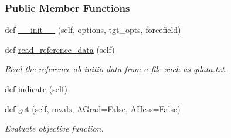 \subsubsection*{Public Member Functions}
\begin{DoxyCompactItemize}
\item 
def \hyperlink{classsrc_1_1interaction_1_1Interaction_a1d02c0274fb07297a75a21195abcfa1f}{\+\_\+\+\_\+init\+\_\+\+\_\+} (self, options, tgt\+\_\+opts, forcefield)
\item 
def \hyperlink{classsrc_1_1interaction_1_1Interaction_aa48acb8e4fb977757bf194d363996b4e}{read\+\_\+reference\+\_\+data} (self)
\begin{DoxyCompactList}\small\item\em Read the reference ab initio data from a file such as qdata.\+txt. \end{DoxyCompactList}\item 
def \hyperlink{classsrc_1_1interaction_1_1Interaction_a701bc0f64d4ad094259c21a75d7addac}{indicate} (self)
\item 
def \hyperlink{classsrc_1_1interaction_1_1Interaction_a38b00f6a1a99561520b30f6995492de9}{get} (self, mvals, A\+Grad=False, A\+Hess=False)
\begin{DoxyCompactList}\small\item\em Evaluate objective function. \end{DoxyCompactList}\end{DoxyCompactItemize}
